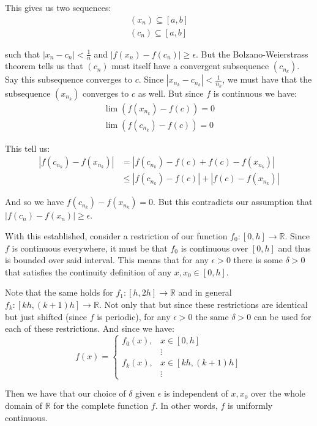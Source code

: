 \documentclass{article}
\newcommand{\R}{\mathbb R}
\begin{document}
This gives us two sequences:
\begin{gather*}
  (x_n)\subseteq[a,b]\\
  (c_n)\subseteq[a,b]
\end{gather*}

such that $|x_n-c_n|<\frac{1}{n}$ and $|f(x_n)-f(c_n)|\ge \epsilon$. But the Bolzano-Weierstrass theorem tells us that $(c_n)$ must itself have a convergent subsequence $(c_{n_k})$. Say this subsequence converges to $c$. Since $|x_{n_k}-c_{n_k}|<\frac{1}{n_k}$, we must have that the subsequence $(x_{n_k})$ converges to $c$ as well. But since $f$ is continuous we have:
\begin{gather*}
  \lim(f(x_{n_k})-f(c))=0\\
  \lim(f(c_{n_k})-f(c))=0
\end{gather*}

This tell us:
\begin{align*}
  |f(c_{n_k})-f(x_{n_k})|&=|f(c_{n_k})-f(c)+f(c)-f(x_{n_k})|\\
  &\le |f(c_{n_k})-f(c)|+|f(c)-f(x_{n_k})|\tag{triangle inequality}
\end{align*}

And so we have $f(c_{n_k})-f(x_{n_k})=0$. But this contradicts our assumption that $|f(c_n)-f(x_n)|\ge \epsilon$.
\bigskip

With this established, consider a restriction of our function $f_0:[0,h]\to\R$. Since $f$ is continuous everywhere, it must be that $f_0$ is continuous over $[0,h]$ and thus is bounded over said interval. This means that for any $\epsilon>0$ there is some $\delta>0$ that satisfies the continuity definition of any $x,x_0\in[0,h]$.

Note that the same holds for $f_1:[h,2h]\to\R$ and in general $f_k:[kh,(k+1)h]\to\R$. Not only that but since these restrictions are identical but just shifted (since $f$ is periodic), for any $\epsilon>0$ the same $\delta>0$ can be used for each of these restrictions. And since we have:
$$f(x)=\begin{cases}
  f_0(x),&x\in[0,h]\\
  &\vdots\\
  f_k(x),&x\in[kh,(k+1)h]\\
  &\vdots
\end{cases}$$

Then we have that our choice of $\delta$ given $\epsilon$ is independent of $x,x_0$ over the whole domain of $\R$ for the complete function $f$. In other words, $f$ is uniformly continuous.
\end{document}
